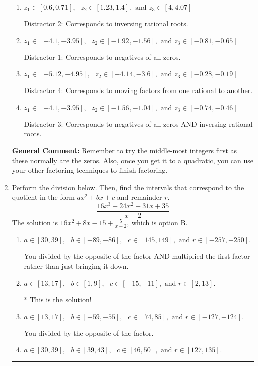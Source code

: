 \documentclass{extbook}[14pt]
\newcommand{\litem}[1]{\item #1

\rule{\textwidth}{0.4pt}}
\begin{document}
\begin{enumerate}
{\begin{enumerate}[label=\Alph*.]
* This is the solution!
\item \( z_1 \in [0.6, 0.71], \text{   }  z_2 \in [1.23, 1.4], \text{   and   } z_3 \in [4, 4.07] \)

 Distractor 2: Corresponds to inversing rational roots.
\item \( z_1 \in [-4.1, -3.95], \text{   }  z_2 \in [-1.92, -1.56], \text{   and   } z_3 \in [-0.81, -0.65] \)

 Distractor 1: Corresponds to negatives of all zeros.
\item \( z_1 \in [-5.12, -4.95], \text{   }  z_2 \in [-4.14, -3.6], \text{   and   } z_3 \in [-0.28, -0.19] \)

 Distractor 4: Corresponds to moving factors from one rational to another.
\item \( z_1 \in [-4.1, -3.95], \text{   }  z_2 \in [-1.56, -1.04], \text{   and   } z_3 \in [-0.74, -0.46] \)

 Distractor 3: Corresponds to negatives of all zeros AND inversing rational roots.
\end{enumerate}

\textbf{General Comment:} Remember to try the middle-most integers first as these normally are the zeros. Also, once you get it to a quadratic, you can use your other factoring techniques to finish factoring.
}
\litem{
Perform the division below. Then, find the intervals that correspond to the quotient in the form $ax^2+bx+c$ and remainder $r$.
\[ \frac{16x^{3} -24 x^{2} -31 x + 35}{x -2} \]The solution is \( 16x^{2} +8 x -15 + \frac{5}{x -2} \), which is option B.\begin{enumerate}[label=\Alph*.]
\item \( a \in [30, 39], \text{   } b \in [-89, -86], \text{   } c \in [145, 149], \text{   and   } r \in [-257, -250]. \)

 You divided by the opposite of the factor AND multiplied the first factor rather than just bringing it down.
\item \( a \in [13, 17], \text{   } b \in [1, 9], \text{   } c \in [-15, -11], \text{   and   } r \in [2, 13]. \)

* This is the solution!
\item \( a \in [13, 17], \text{   } b \in [-59, -55], \text{   } c \in [74, 85], \text{   and   } r \in [-127, -124]. \)

 You divided by the opposite of the factor.
\item \( a \in [30, 39], \text{   } b \in [39, 43], \text{   } c \in [46, 50], \text{   and   } r \in [127, 135]. \)


\end{enumerate}}
\end{enumerate}
\end{document}
